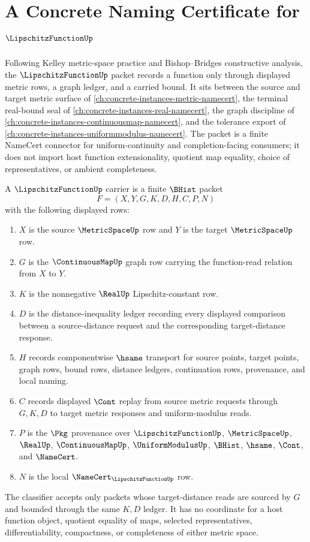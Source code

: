 \chapter{A Concrete Naming Certificate for $\LipschitzFunctionUp$}
\label{ch:concrete-instances-lipschitz-function-namecert}

Following Kelley metric-space practice and Bishop--Bridges constructive analysis, the $\LipschitzFunctionUp$ packet records a function only through displayed metric rows, a graph ledger, and a carried bound. It sits between the source and target metric surface of \autoref{ch:concrete-instances-metric-namecert}, the terminal real-bound seal of \autoref{ch:concrete-instances-real-namecert}, the graph discipline of \autoref{ch:concrete-instances-continuousmap-namecert}, and the tolerance export of \autoref{ch:concrete-instances-uniformmodulus-namecert}. The packet is a finite NameCert connector for uniform-continuity and completion-facing consumers; it does not import host function extensionality, quotient map equality, choice of representatives, or ambient completeness.

\begin{definition}
\label{def:lipschitz-function-carrier}
A $\LipschitzFunctionUp$ carrier is a finite $\BHist$ packet
$$
F=(X,Y,G,K,D,H,C,P,N)
$$
with the following displayed rows:
\begin{enumerate}
\item $X$ is the source $\MetricSpaceUp$ row and $Y$ is the target $\MetricSpaceUp$ row.
\item $G$ is the $\ContinuousMapUp$ graph row carrying the function-read relation from $X$ to $Y$.
\item $K$ is the nonnegative $\RealUp$ Lipschitz-constant row.
\item $D$ is the distance-inequality ledger recording every displayed comparison between a source-distance request and the corresponding target-distance response.
\item $H$ records componentwise $\hsame$ transport for source points, target points, graph rows, bound rows, distance ledgers, continuation rows, provenance, and local naming.
\item $C$ records displayed $\Cont$ replay from source metric requests through $G,K,D$ to target metric responses and uniform-modulus reads.
\item $P$ is the $\Pkg$ provenance over $\LipschitzFunctionUp$, $\MetricSpaceUp$, $\RealUp$, $\ContinuousMapUp$, $\UniformModulusUp$, $\BHist$, $\hsame$, $\Cont$, and $\NameCert$.
\item $N$ is the local $\NameCert_{\LipschitzFunctionUp}$ row.
\end{enumerate}
The classifier accepts only packets whose target-distance reads are sourced by $G$ and bounded through the same $K,D$ ledger. It has no coordinate for a host function object, quotient equality of maps, selected representatives, differentiability, compactness, or completeness of either metric space.
\end{definition}

